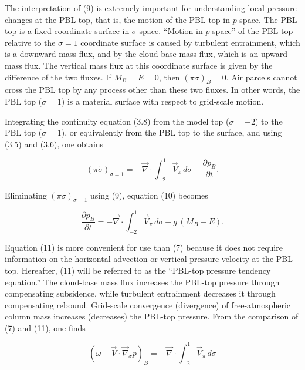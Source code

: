 \documentclass[12pt,openany]{book}
\begin{document}
The interpretation of (9) is extremely important for understanding local pressure changes at the PBL top, that is, the motion of the PBL top in $p$-space.  
The PBL top is a fixed coordinate surface in $\sigma$-space.  
“Motion in $p$-space” of the PBL top relative to the $\sigma=1$ coordinate surface is caused by turbulent entrainment, which is a downward mass flux, and by the cloud-base mass flux, which is an upward mass flux.  
The vertical mass flux at this coordinate surface is given by the difference of the two fluxes.  
If $M_B = E = 0$, then $(\pi \dot{\sigma})_B = 0$.  
Air parcels cannot cross the PBL top by any process other than these two fluxes.  
In other words, the PBL top ($\sigma=1$) is a material surface with respect to grid-scale motion.

Integrating the continuity equation (3.8) from the model top ($\sigma=-2$) to the PBL top ($\sigma=1$), or equivalently from the PBL top to the surface, and using (3.5) and (3.6), one obtains

\begin{equation}
(\pi \dot{\sigma})_{\sigma=1}
=
- \vec{\nabla} \cdot \int_{-2}^{1} \vec{V}_{\pi} \, d\sigma
-
\frac{\partial p_B}{\partial t}.
\tag{4.10}
\label{eq:4.10}
\end{equation}

Eliminating $(\pi \dot{\sigma})_{\sigma=1}$ using (9), equation (10) becomes

\begin{equation}
\frac{\partial p_B}{\partial t}
=
- \vec{\nabla} \cdot \int_{-2}^{1} \vec{V}_{\pi} \, d\sigma
+
g\,(M_B - E).
\tag{4.11}
\label{eq:4.11}
\end{equation}

Equation (11) is more convenient for use than (7) because it does not require information on the horizontal advection or vertical pressure velocity at the PBL top.  
Hereafter, (11) will be referred to as the “PBL-top pressure tendency equation.”  
The cloud-base mass flux increases the PBL-top pressure through compensating subsidence, while turbulent entrainment decreases it through compensating rebound.  
Grid-scale convergence (divergence) of free-atmospheric column mass increases (decreases) the PBL-top pressure.
From the comparison of (7) and (11), one finds

\begin{equation}
\left(
\omega
-
\vec{V} \cdot \vec{\nabla}_{\sigma} p
\right)_B
=
- \vec{\nabla} \cdot \int_{-2}^{1} \vec{V}_{\pi} \, d\sigma
\tag{4.12}
\label{eq:4.12}
\end{equation}
\end{document}
